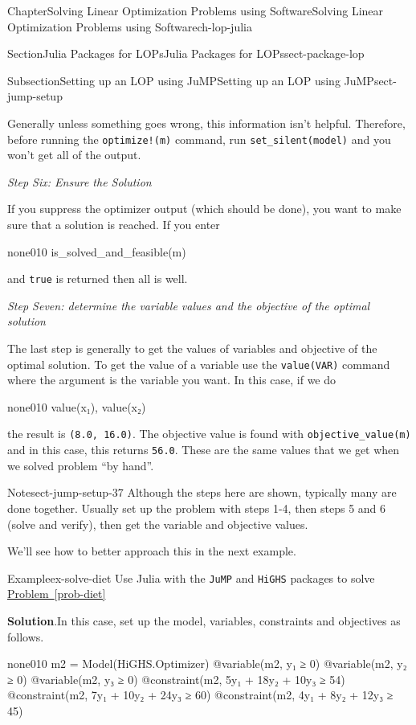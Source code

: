 \documentclass[oneside,10pt,]{book}
\newcommand{\blocktitlefont}{\relax}
\newcommand{\xreffont}{\relax}
\newcommand{\mono}[1]{\texttt{#1}}
\numberwithin{equation}{section}
\begin{document}
\begin{chapterptx}{Chapter}{Solving Linear Optimization Problems using Software}{}{Solving Linear Optimization Problems using Software}{}{}{ch-lop-julia}
\begin{sectionptx}{Section}{Julia Packages for LOPs}{}{Julia Packages for LOPs}{}{}{sect-package-lop}
\begin{subsectionptx}{Subsection}{Setting up an LOP using JuMP}{}{Setting up an LOP using JuMP}{}{}{sect-jump-setup}
\begin{codedisplay}
\end{codedisplay}
%
\par
Generally unless something goes wrong, this information isn't helpful. Therefore, before running the \mono{optimize!(m)} command, run \mono{set\_silent(model)} and you won't get all of the output.%
\par
\emph{Step Six: Ensure the Solution}%
\par
If you suppress the optimizer output (which should be done), you want to make sure that a solution is reached. If you enter%
\begin{program}{none}{0}{1}{0}
is_solved_and_feasible(m)
\end{program}
and \mono{true} is returned then all is well.%
\par
\emph{Step Seven: determine the variable values and the objective of the optimal solution}%
\par
The last step is generally to get the values of variables and objective of the optimal solution. To get the value of a variable use the \mono{value(VAR)} command where the argument is the variable you want. In this case, if we do%
\begin{program}{none}{0}{1}{0}
value(x₁), value(x₂)
\end{program}
the result is \mono{(8.0, 16.0)}. The objective value is found with \mono{objective\_value(m)} and in this case, this returns \mono{56.0}. These are the same values that we get when we solved problem ``by hand''.%
\begin{note}{Note}{}{sect-jump-setup-37}%
Although the steps here are shown, typically many are done together. Usually set up the problem with steps 1-4, then steps 5 and 6 (solve and verify), then get the variable and objective values.%
\end{note}
We'll see how to better approach this in the next example.%
\begin{example}{Example}{}{ex-solve-diet}%
Use Julia with the \mono{JuMP} and \mono{HiGHS} packages to solve \hyperref[prob-diet]{Problem~{\xreffont\ref{prob-diet}}}%
\par\smallskip%
\noindent\textbf{\blocktitlefont Solution}.\hypertarget{ex-solve-diet-2}{}\quad{}In this case, set up the model, variables, constraints and objectives as follows.%
\begin{programnumbered}{none}{0}{1}{0}
m2 = Model(HiGHS.Optimizer)
@variable(m2, y₁ ≥ 0)
@variable(m2, y₂ ≥ 0)
@variable(m2, y₃ ≥ 0)
@constraint(m2, 5y₁ + 18y₂ + 10y₃ ≥ 54)
@constraint(m2, 7y₁ + 10y₂ + 24y₃ ≥ 60)
@constraint(m2, 4y₁ + 8y₂ + 12y₃ ≥ 45)

\end{programnumbered}
\end{example}
\end{subsectionptx}
\end{sectionptx}
\end{chapterptx}
\end{document}
